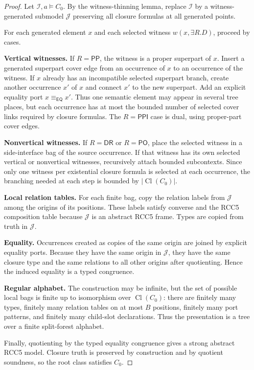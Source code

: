 \documentclass[11pt]{article}
\newcommand{\EQ}{\mathsf{EQ}}
\newcommand{\PP}{\mathsf{PP}}
\newcommand{\PPI}{\mathsf{PPI}}
\newcommand{\PO}{\mathsf{PO}}
\newcommand{\DR}{\mathsf{DR}}
\newcommand{\Cl}{\operatorname{Cl}}
\begin{document}
\begin{proof}
Let $\mathcal I,a\models C_0$.  By the witness-thinning lemma, replace $\mathcal I$ by a witness-generated submodel $\mathcal J$ preserving all closure formulas at all generated points.

For each generated element $x$ and each selected witness $w(x,\exists R.D)$, proceed by cases.

\smallskip
\noindent\textbf{Vertical witnesses.}  If $R=\PP$, the witness is a proper superpart of $x$.  Insert a generated superpart cover edge from an occurrence of $x$ to an occurrence of the witness.  If $x$ already has an incompatible selected superpart branch, create another occurrence $x'$ of $x$ and connect $x'$ to the new superpart.  Add an explicit equality port $x\equiv_{\EQ}x'$.  Thus one semantic element may appear in several tree places, but each occurrence has at most the bounded number of selected cover links required by closure formulas.  The $R=\PPI$ case is dual, using proper-part cover edges.

\smallskip
\noindent\textbf{Nonvertical witnesses.}  If $R=\DR$ or $R=\PO$, place the selected witness in a side-interface bag of the source occurrence.  If that witness has its own selected vertical or nonvertical witnesses, recursively attach bounded subcontexts.  Since only one witness per existential closure formula is selected at each occurrence, the branching needed at each step is bounded by $|\Cl(C_0)|$.

\smallskip
\noindent\textbf{Local relation tables.}  For each finite bag, copy the relation labels from $\mathcal J$ among the origins of its positions.  These labels satisfy converse and the RCC5 composition table because $\mathcal J$ is an abstract RCC5 frame.  Types are copied from truth in $\mathcal J$.

\smallskip
\noindent\textbf{Equality.}  Occurrences created as copies of the same origin are joined by explicit equality ports.  Because they have the same origin in $\mathcal J$, they have the same closure type and the same relations to all other origins after quotienting.  Hence the induced equality is a typed congruence.

\smallskip
\noindent\textbf{Regular alphabet.}  The construction may be infinite, but the set of possible local bags is finite up to isomorphism over $\Cl(C_0)$: there are finitely many types, finitely many relation tables on at most $B$ positions, finitely many port patterns, and finitely many child-slot declarations.  Thus the presentation is a tree over a finite split-forest alphabet.

Finally, quotienting by the typed equality congruence gives a strong abstract RCC5 model.  Closure truth is preserved by construction and by quotient soundness, so the root class satisfies $C_0$.
\end{proof}
\end{document}
